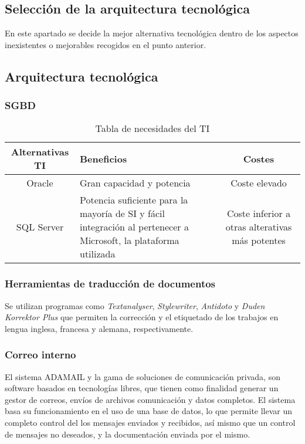 \documentclass[11pt,a4paper,spanish,twoside]{book}
\begin{document}
\begin{itemize}
\section{Selección de la arquitectura tecnológica}
En este apartado se decide la mejor alternativa tecnológica
dentro de los aspectos inexistentes o mejorables recogidos en el punto
anterior.

\subsection{Arquitectura tecnológica}


\subsubsection{SGBD}

\begin{table}[!h]
\centering
  \begin{tabular}{clc}
    \textbf{Alternativas TI} & \textbf{Beneficios} &
    \textbf{Costes} \\ \hline 
    \hline \hline
    Oracle\cite{ora} & Gran capacidad y potencia & Coste elevado\\
    SQL Server\cite{sql} & Potencia suficiente para la mayoría de SI y fácil
    integración al pertenecer a Microsoft, la plataforma utilizada & Coste
    inferior a otras alterativas más potentes\\
  \end{tabular}
\caption{Tabla de necesidades del TI}
\end{table}

\subsubsection{Herramientas de traducción de documentos}
Se utilizan programas como \emph{Textanalyser}, \emph{Stylewriter},
\emph{Antidoto} y \emph{Duden Korrektor Plus} que permiten la corrección y el
etiquetado de los trabajos en lengua inglesa, francesa y alemana,
respectivamente\cite{tra}. 

\subsubsection{Correo interno}
El sistema ADAMAIL\cite{ada} y la gama de soluciones de comunicación privada,
son software basados en tecnologías libres, que tienen como finalidad generar un
gestor de correos, envíos de archivos comunicación y datos completos. El
sistema basa su funcionamiento en el uso de una base de datos, lo que permite
llevar un completo control del los mensajes enviados y recibidos, así mismo
que un control de mensajes no deseados, y la documentación enviada por el
mismo. 


\end{itemize}
\end{document}
